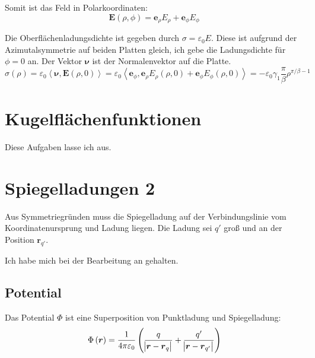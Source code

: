 \documentclass[11pt, ngerman, fleqn]{article}
\newcommand{\inner}[2]{\left\langle #1, #2 \right\rangle}
\renewcommand{\vec}[1]{\boldsymbol{#1}}
\begin{document}
Somit ist das Feld in Polarkoordinaten:
\[
	\vec E(\rho, \phi) = \vec e_\rho E_\rho  + \vec e_\phi E_\phi
\]

Die Oberflächenladungsdichte ist gegeben durch $\sigma = \varepsilon_0 E$.
Diese ist aufgrund der Azimutalsymmetrie auf beiden Platten gleich, ich gebe
die Ladungsdichte für $\phi = 0$ an. Der Vektor $\vec \nu$ ist der
Normalenvektor auf die Platte.
\[
	\sigma(\rho)
	= \varepsilon_0 \inner{\vec \nu}{\vec E(\rho, 0)}
	= \varepsilon_0 \inner{\vec e_\phi}{\vec e_\rho E_\rho(\rho, 0)  + \vec e_\phi E_\phi(\rho, 0)}
	= - \varepsilon_0 \gamma_1 \frac\pi\beta \rho^{\pi/\beta - 1}
\]


\section{Kugelflächenfunktionen}

Diese Aufgaben lasse ich aus.


\section{Spiegelladungen 2}

Aus Symmetriegründen muss die Spiegelladung auf der Verbindungslinie vom
Koordinatenursprung und Ladung liegen. Die Ladung sei $q'$ groß und an der
Position $\vec r_{q'}$.

Ich habe mich bei der Bearbeitung an
\cite[Seite~70]{jackson-klassische_elektrodynamik} gehalten.

\subsection{Potential}

Das Potential $\Phi$ ist eine Superposition von Punktladung und Spiegelladung:
\[
	\Phi\del{\vec r} = \frac{1}{4 \pi \varepsilon_0} \del{
		\frac{q}{\abs{\vec r - \vec r_q}}
		+
		\frac{q'}{\abs{\vec r - \vec r_{q'}}}
	}
\]
\end{document}
